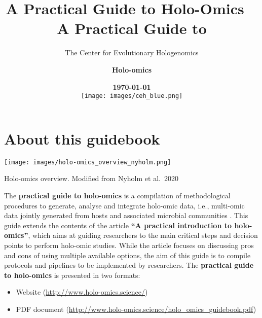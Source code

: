 \documentclass[
]{book}
\title{A Practical Guide to Holo-Omics}
\author{The Center for Evolutionary Hologenomics}
\date{}
\providecommand{\tightlist}{%
  \setlength{\itemsep}{0pt}\setlength{\parskip}{0pt}}
\begin{document}
\title{%
       \vspace{0.5cm} %
       \fontsize{38}{38} %
       \selectfont %
       \\ A Practical Guide to} %
\author{\fontsize{64}{64}\selectfont \textbf{Holo-omics}}
\date{\fontsize{12}{14}\selectfont \textbf{\today}\\[6cm]
      \texttt{[image: images/ceh\_blue.png]}}
\maketitle

{
\setcounter{tocdepth}{1}
\tableofcontents
}
\hypertarget{about-this-guidebook}{%
\chapter*{About this guidebook}\label{about-this-guidebook}}

\texttt{[image: images/holo-omics\_overview\_nyholm.png]}

\scriptsize

Holo-omics overview. Modified from Nyholm et al.~2020 \citep{Nyholm2020-ua}

\normalsize

The \textbf{practical guide to holo-omics} is a compilation of methodological procedures to generate, analyse and integrate holo-omic data, i.e., multi-omic data jointly generated from hosts and associated microbial communities \citep{Nyholm2020-ua, Limborg2018-tf}. This guide extends the contents of the article \textbf{``A practical introduction to holo-omics''}, which aims at guiding researchers to the main critical steps and decision points to perform holo-omic studies. While the article focuses on discussing pros and cons of using multiple available options, the aim of this guide is to compile protocols and pipelines to be implemented by researchers. The \textbf{practical guide to holo-omics} is presented in two formats:

\begin{itemize}
\tightlist
\item
  Website (\url{http://www.holo-omics.science/})
\item
  PDF document (\url{http://www.holo-omics.science/holo_omics_guidebook.pdf})
\end{itemize}
\end{document}
